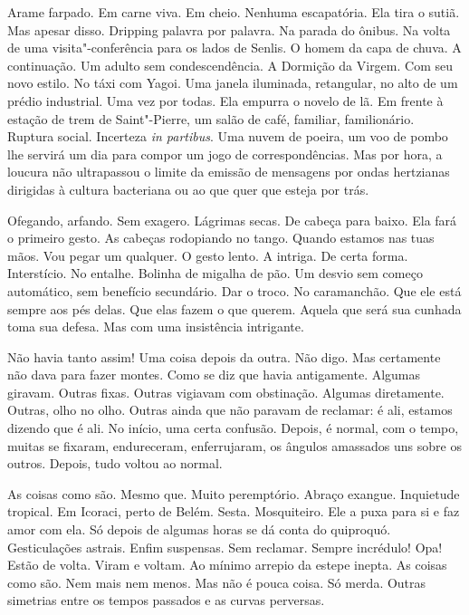Arame farpado. Em carne viva. Em cheio. Nenhuma escapatória. Ela tira o
sutiã. Mas apesar disso. Dripping palavra por palavra. Na parada do
ônibus. Na volta de uma visita"-conferência para os lados de Senlis. O
homem da capa de chuva. A continuação. Um adulto sem condescendência. A
Dormição da Virgem. Com seu novo estilo. No táxi com Yagoi. Uma janela
iluminada, retangular, no alto de um prédio industrial. Uma vez por
todas. Ela empurra o novelo de lã. Em frente à estação de trem de
Saint"-Pierre, um salão de café, familiar, familionário. Ruptura social.
Incerteza \emph{in partibus}. Uma nuvem de poeira, um voo de pombo lhe
servirá um dia para compor um jogo de correspondências. Mas por hora, a
loucura não ultrapassou o limite da emissão de mensagens por ondas
hertzianas dirigidas à cultura bacteriana ou ao que quer que esteja por
trás.

Ofegando, arfando. Sem exagero. Lágrimas secas. De cabeça para baixo.
Ela fará o primeiro gesto. As cabeças rodopiando no tango. Quando
estamos nas tuas mãos. Vou pegar um qualquer. O gesto lento. A intriga.
De certa forma. Interstício. No entalhe. Bolinha de migalha de pão. Um
desvio sem começo automático, sem benefício secundário. Dar o troco. No
caramanchão. Que ele está sempre aos pés delas. Que elas fazem o que
querem. Aquela que será sua cunhada toma sua defesa. Mas com uma
insistência intrigante.

Não havia tanto assim! Uma coisa depois da outra. Não digo. Mas
certamente não dava para fazer montes. Como se diz que havia
antigamente. Algumas giravam. Outras fixas. Outras vigiavam com
obstinação. Algumas diretamente. Outras, olho no olho. Outras ainda que
não paravam de reclamar: é ali, estamos dizendo que é ali. No início,
uma certa confusão. Depois, é normal, com o tempo, muitas se fixaram,
endureceram, enferrujaram, os ângulos amassados uns sobre os outros.
Depois, tudo voltou ao normal.

As coisas como são. Mesmo que. Muito peremptório. Abraço exangue.
Inquietude tropical. Em Icoraci, perto de Belém. Sesta. Mosquiteiro. Ele
a puxa para si e faz amor com ela. Só depois de algumas horas se dá
conta do quiproquó. Gesticulações astrais. Enfim suspensas. Sem
reclamar. Sempre incrédulo! Opa! Estão de volta. Viram e voltam. Ao
mínimo arrepio da estepe inepta. As coisas como são. Nem mais nem menos.
Mas não é pouca coisa. Só merda. Outras simetrias entre os tempos
passados e as curvas perversas.

